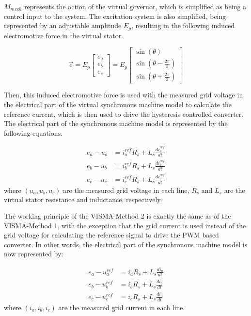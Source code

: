 $M_{mech}$ represents the action of the virtual governor, which is simplified as
being a control input to the system. The excitation system is also simplified,
being represented by an adjustable amplitude $E_p$, resulting in the following
induced electromotive force in the virtual stator.

\begin{equation*}
    \overrightarrow{e} =
    E_p\begin{bmatrix}e_a \\e_b \\ e_c\end{bmatrix} =
    E_p\begin{bmatrix}\sin{(\theta)} \\\sin{(\theta - \frac{2\pi}{3})} \\ \sin{(\theta + \frac{2\pi}{3})} \end{bmatrix}
\end{equation*}

Then, this induced electromotive force is used with the measured grid voltage in
the electrical part of the virtual synchronous machine model to calculate the
reference current, which is then used to drive the hysteresis controlled
converter. The electrical part of the synchronous machine model is represented
by the following equations.

\begin{equation*}
    \begin{aligned}
        e_a - u_a &= i_a^{ref}R_s + L_s\frac{di_a^{ref}}{dt}\\
        e_b - u_b &= i_b^{ref}R_s + L_s\frac{di_b^{ref}}{dt}\\
        e_c - u_c &= i_c^{ref}R_s + L_s\frac{di_c^{ref}}{dt}
    \end{aligned}
\end{equation*}
\noindent where $(u_a, u_b, u_c)$ are the measured grid voltage in each line,
$R_s$ and $L_s$ are the virtual stator resistance and inductance, respectively.

The working principle of the VISMA-Method 2 is exactly the same as of the
VISMA-Method 1, with the exception that the grid current is used instead of the
grid voltage for calculating the reference signal to drive the PWM based
converter. In other words, the electrical part of the synchronous machine model
is now represented by:

\begin{equation*}
    \begin{aligned}
        e_a - u_a^{ref} &= i_a R_s + L_s\frac{di_a}{dt}\\
        e_b - u_b^{ref} &= i_b R_s + L_s\frac{di_b}{dt}\\
        e_c - u_c^{ref} &= i_c R_s + L_s\frac{di_c}{dt}
    \end{aligned}
\end{equation*}
\noindent where $(i_a, i_b, i_c)$ are the measured grid current in each line.

